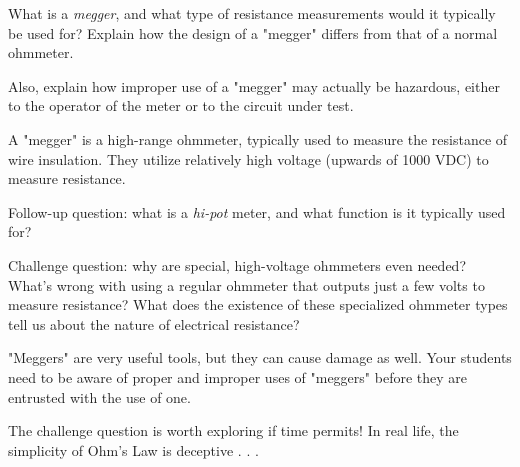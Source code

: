 

What is a {\it megger}, and what type of resistance measurements would it typically be used for?  Explain how the design of a "megger" differs from that of a normal ohmmeter.

Also, explain how improper use of a "megger" may actually be hazardous, either to the operator of the meter or to the circuit under test.







A "megger" is a high-range ohmmeter, typically used to measure the resistance of wire insulation.  They utilize relatively high voltage (upwards of 1000 VDC) to measure resistance.

\vskip 10pt

Follow-up question: what is a {\it hi-pot} meter, and what function is it typically used for?

\vskip 10pt

Challenge question: why are special, high-voltage ohmmeters even needed?  What's wrong with using a regular ohmmeter that outputs just a few volts to measure resistance?  What does the existence of these specialized ohmmeter types tell us about the nature of electrical resistance?







"Meggers" are very useful tools, but they can cause damage as well.  Your students need to be aware of proper and improper uses of "meggers" before they are entrusted with the use of one.

The challenge question is worth exploring if time permits!  In real life, the simplicity of Ohm's Law is deceptive . . .




